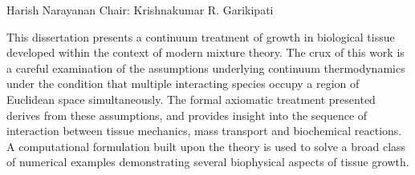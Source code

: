  {Harish Narayanan} {Chair: Krishnakumar
  R. Garikipati}

This dissertation presents a continuum treatment of growth in
biological tissue developed within the context of modern mixture
theory. The crux of this work is a careful examination of the
assumptions underlying continuum thermodynamics under the condition
that multiple interacting species occupy a region of Euclidean space
simultaneously. The formal axiomatic treatment presented derives from
these assumptions, and provides insight into the sequence of
interaction between tissue mechanics, mass transport and biochemical
reactions. A computational formulation built upon the theory is used
to solve a broad class of numerical examples demonstrating several
biophysical aspects of tissue growth.

\thispagestyle{empty}
